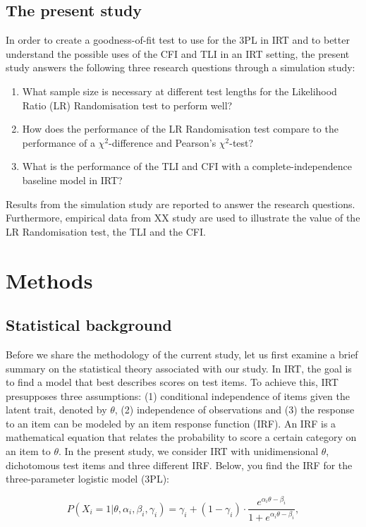 \documentclass[Royal,sageapa,times,doublespace]{sagej}
\begin{document}
\subsection{The present study}
In order to create a goodness-of-fit test to use for the 3PL in IRT and to better understand the possible uses of the CFI and TLI in an IRT setting, the present study answers the following three research questions through a simulation study:
\begin{enumerate}
\item{What sample size is necessary at different test lengths for the Likelihood Ratio (LR) Randomisation test to perform well?}
\item{How does the performance of the LR Randomisation test compare to the performance of a $\chi^2$-difference and Pearson's $\chi^2$-test?}
\item{What is the performance of the TLI and CFI with a complete-independence baseline model in IRT?}
\end{enumerate}
Results from the simulation study are reported to answer the research questions. Furthermore, empirical data from XX study are used to illustrate the value of the LR Randomisation test, the TLI and the CFI.

\section{Methods}
\subsection{Statistical background}
Before we share the methodology of the current study, let us first examine a brief summary on the statistical theory associated with our study. In IRT, the goal is to find a model that best describes scores on test items. To achieve this, IRT presupposes three assumptions: (1) conditional independence of items given the latent trait, denoted by $\theta$, (2) independence of observations and (3) the response to an item can be modeled by an item response function (IRF). An IRF is a mathematical equation that relates the probability to score a certain category on an item to $\theta$. In the present study, we consider IRT with unidimensional $\theta$, dichotomous test items and three different IRF. Below, you find the IRF for the three-parameter logistic model (3PL):

\begin{equation}
P(X_i = 1 | \theta, \alpha_{i}, \beta_{i}, \gamma_{i}) = \gamma_{i} + (1 - \gamma_{i}) \cdot 
\frac{e^{\alpha_{i}\theta - \beta_{i}}}{1 + e^{\alpha_{i}\theta - \beta_{i}}},
\end{equation}
\end{document}
